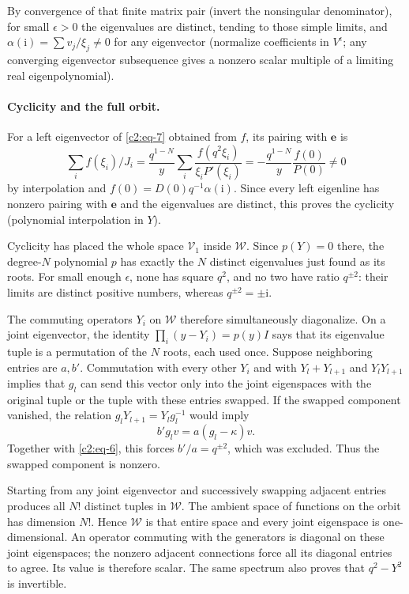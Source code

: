 By convergence of that finite matrix pair (invert the nonsingular denominator), for small \(\epsilon>0\) the eigenvalues are distinct, tending to those simple limits, and \(\alpha(\mathrm i)=\sum v_j/\xi_j\ne0\) for any eigenvector (normalize coefficients in \(V^\epsilon\); any converging eigenvector subsequence gives a nonzero scalar multiple of a limiting real eigenpolynomial).

\paragraph{Cyclicity and the full orbit.}
For a left eigenvector of \eqref{c2:eq-7} obtained from $f$, its pairing
with $\mathbf e$ is
\[
 \sum_i f(\xi_i)/J_i
 =\frac{q^{1-N}}{y}\sum_i\frac{f(q^2\xi_i)}{\xi_i P'(\xi_i)}
 =-\frac{q^{1-N}}y\frac{f(0)}{P(0)}\ne0
\]
by interpolation and \(f(0)=D(0)q^{-1}\alpha(\mathrm i)\). Since every left eigenline has nonzero pairing with \(\mathbf e\) and the eigenvalues are distinct, this proves the cyclicity (polynomial interpolation in \(Y\)).

Cyclicity has placed the whole space $\mathcal V_1$ inside
$\mathcal W$.  Since $p(Y)=0$ there, the degree-$N$ polynomial $p$
has exactly the $N$ distinct eigenvalues just found as its roots.
For small enough $\epsilon$, none has square $q^2$, and no two have
ratio $q^{\pm2}$: their limits are distinct positive numbers, whereas
$q^{\pm2}=\pm\mathrm i$.

The commuting operators $Y_i$ on $\mathcal W$ therefore simultaneously
diagonalize.  On a joint eigenvector, the identity
$\prod_i(y-Y_i)=p(y)I$ says that its eigenvalue tuple is a permutation
of the $N$ roots, each used once.  Suppose neighboring entries are $a,b'$.
Commutation with every other $Y_i$ and with $Y_l+Y_{l+1}$ and
$Y_lY_{l+1}$ implies that $g_l$ can send this vector only into
the joint eigenspaces with the original tuple or the tuple with these
entries swapped.  If the swapped component vanished, the relation
$g_lY_{l+1}=Y_lg_l^{-1}$ would imply
\[
 b'g_lv=a(g_l-\kappa)v.
\]
Together with \eqref{c2:eq-6}, this forces $b'/a=q^{\pm2}$, which
was excluded.  Thus the swapped component is nonzero.

Starting from any joint eigenvector and successively swapping adjacent
entries produces all $N!$ distinct tuples in $\mathcal W$.  The ambient
space of functions on the orbit has dimension $N!$.  Hence
$\mathcal W$ is that entire space and every joint eigenspace is
one-dimensional.  An operator commuting with the generators is diagonal
on these joint eigenspaces; the nonzero adjacent connections force all
its diagonal entries to agree.  Its value is therefore scalar.  The same
spectrum also proves that $q^2-Y^2$ is invertible.

